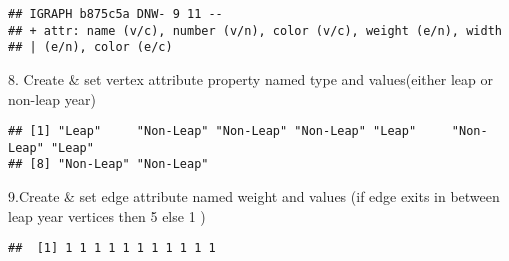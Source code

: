 \documentclass[
]{article}
\newenvironment{Shaded}{\begin{snugshade}}{\end{snugshade}}
\newcommand{\DecValTok}[1]{\textcolor[rgb]{0.00,0.00,0.81}{#1}}
\newcommand{\FunctionTok}[1]{\textcolor[rgb]{0.00,0.00,0.00}{#1}}
\newcommand{\NormalTok}[1]{#1}
\newcommand{\OtherTok}[1]{\textcolor[rgb]{0.56,0.35,0.01}{#1}}
\newcommand{\SpecialCharTok}[1]{\textcolor[rgb]{0.00,0.00,0.00}{#1}}
\newcommand{\StringTok}[1]{\textcolor[rgb]{0.31,0.60,0.02}{#1}}
\begin{document}
\begin{verbatim}
## IGRAPH b875c5a DNW- 9 11 -- 
## + attr: name (v/c), number (v/n), color (v/c), weight (e/n), width
## | (e/n), color (e/c)
\end{verbatim}

8. Create \& set vertex attribute property named type and values(either
leap or non-leap year)

\begin{Shaded}
\end{Shaded}

\begin{verbatim}
## [1] "Leap"     "Non-Leap" "Non-Leap" "Non-Leap" "Leap"     "Non-Leap" "Leap"    
## [8] "Non-Leap" "Non-Leap"
\end{verbatim}

9.Create \& set edge attribute named weight and values (if edge exits in
between leap year vertices then 5 else 1 )

\begin{Shaded}
\end{Shaded}

\begin{verbatim}
##  [1] 1 1 1 1 1 1 1 1 1 1 1
\end{verbatim}
\end{document}
